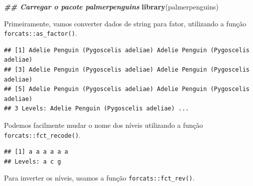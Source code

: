 \documentclass[
]{article}
\newenvironment{Shaded}{\begin{snugshade}}{\end{snugshade}}
\newcommand{\AttributeTok}[1]{\textcolor[rgb]{0.13,0.29,0.53}{#1}}
\newcommand{\DocumentationTok}[1]{\textcolor[rgb]{0.56,0.35,0.01}{\textbf{\textit{#1}}}}
\newcommand{\FunctionTok}[1]{\textcolor[rgb]{0.13,0.29,0.53}{\textbf{#1}}}
\newcommand{\NormalTok}[1]{#1}
\newcommand{\SpecialCharTok}[1]{\textcolor[rgb]{0.81,0.36,0.00}{\textbf{#1}}}
\newcommand{\StringTok}[1]{\textcolor[rgb]{0.31,0.60,0.02}{#1}}
\begin{document}
\begin{Shaded}
\begin{Highlighting}[]
\DocumentationTok{\#\# Carregar o pacote palmerpenguins}
\FunctionTok{library}\NormalTok{(palmerpenguins)}
\end{Highlighting}
\end{Shaded}

Primeiramente, vamos converter dados de string para fator, utilizando a função \texttt{forcats::as\_factor()}.

\begin{Shaded}
\end{Shaded}

\begin{verbatim}
## [1] Adelie Penguin (Pygoscelis adeliae) Adelie Penguin (Pygoscelis adeliae)
## [3] Adelie Penguin (Pygoscelis adeliae) Adelie Penguin (Pygoscelis adeliae)
## [5] Adelie Penguin (Pygoscelis adeliae) Adelie Penguin (Pygoscelis adeliae)
## 3 Levels: Adelie Penguin (Pygoscelis adeliae) ...
\end{verbatim}

Podemos facilmente mudar o nome dos níveis utilizando a função \texttt{forcats::fct\_recode()}.

\begin{Shaded}
\end{Shaded}

\begin{verbatim}
## [1] a a a a a a
## Levels: a c g
\end{verbatim}

Para inverter os níveis, usamos a função \texttt{forcats::fct\_rev()}.

\begin{Shaded}
\end{Shaded}
\end{document}
